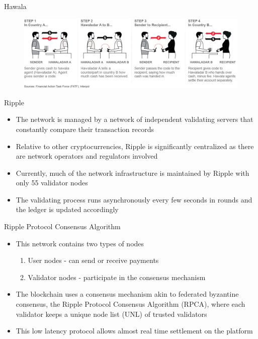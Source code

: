 \documentclass[11pt]{beamer}
\begin{document}

\begin{frame}{Hawala}
	\begin{figure}[]
		\centering
		\includegraphics  [scale=0.3]{Images/hawala}
	\end{figure}
\end{frame}


\begin{frame}{Ripple}
	\begin{itemize}
		\item The network is managed by a network of independent validating servers that constantly compare their transaction records
		\item Relative to other cryptocurrencies, Ripple is significantly centralized as there are network operators and regulators involved
		\item Currently, much of the network infrastructure is maintained by Ripple with only 55 validator nodes
		\item The validating process runs asynchronously every few seconds in rounds and the ledger is updated accordingly
	\end{itemize}
\end{frame}


\begin{frame}{Ripple Protocol Consensus Algorithm}
	\begin{itemize}
		\item This network contains two types of nodes
		\begin{enumerate}
			\item User nodes - can send or receive payments
			\item Validator nodes - participate in the consensus mechanism
		\end{enumerate}
		\item The blockchain uses a consensus mechanism akin to federated byzantine consensus, the Ripple Protocol Consensus Algorithm (RPCA), where each validator keeps a unique node list (UNL) of trusted validators
		\item This low latency protocol allows almost real time settlement on the platform
	\end{itemize}
\end{frame}
\end{document}
